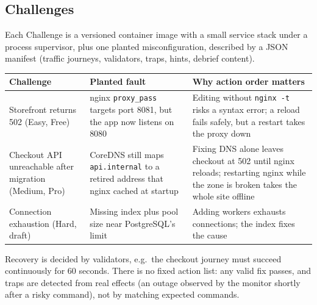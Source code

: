 \documentclass[11pt,a4paper]{article}
\begin{document}
\subsection{Challenges}
Each Challenge is a versioned container image with a small service stack under
a process supervisor, plus one planted misconfiguration, described by a JSON
manifest (traffic journeys, validators, traps, hints, debrief content).
\begin{center}\small
\begin{tabularx}{\linewidth}{@{}>{\raggedright\arraybackslash}p{30mm}YY@{}}
\toprule
\textbf{Challenge} & \textbf{Planted fault} & \textbf{Why action order matters}\\
\midrule
Storefront returns 502 (Easy, Free) & nginx \texttt{proxy\_pass} targets port 8081,
but the app now listens on 8080 & Editing without \texttt{nginx -t} risks a syntax
error; a reload fails safely, but a restart takes the proxy down\\
Checkout API unreachable after migration (Medium, Pro) & CoreDNS still maps
\texttt{api.internal} to a retired address that nginx cached at startup & Fixing
DNS alone leaves checkout at 502 until nginx reloads; restarting nginx while
the zone is broken takes the whole site offline\\
Connection exhaustion (Hard, draft) & Missing index plus pool size near
PostgreSQL's limit & Adding workers exhausts connections; the index fixes the cause\\
\bottomrule
\end{tabularx}
\end{center}
Recovery is decided by validators, e.g.\ the checkout journey must succeed
continuously for 60 seconds. There is no fixed action list: any valid fix
passes, and traps are detected from real effects (an outage observed by the
monitor shortly after a risky command), not by matching expected commands.
\end{document}
